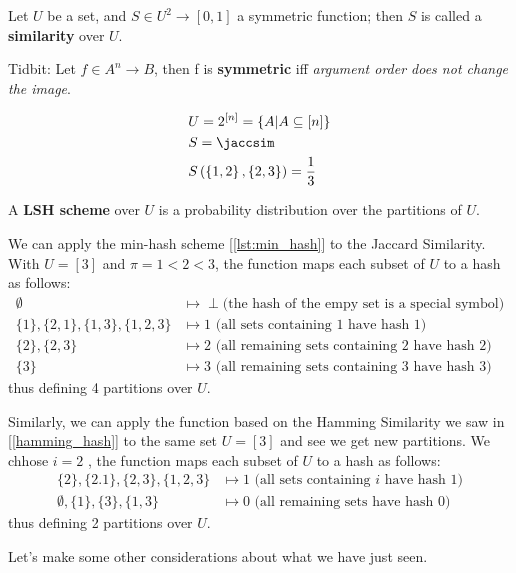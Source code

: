 	Let $U$ be a set, and $S \in U^2 \to [0, 1]$ a symmetric function; then $S$ is called a \textbf{similarity} over $U$.
	
	Tidbit: Let $f \in A^n \to B$, then f is \textbf{symmetric} iff \textit{argument order does not change the image}. %
	
	\ex \begin{align*}
		& U=2^{[n]}=\left\lbrace A | A \subseteq [n] \right\rbrace \\
		& S=\jaccsim \\
		& S\left( \left\lbrace 1,2 \right\rbrace , \left\lbrace 2,3 \right\rbrace \right) =\frac{1}{3}
	\end{align*}
	
	A \textbf{LSH scheme} over $U$ is a probability distribution over the partitions of $U$.
	
	\ex We can apply the min-hash scheme [\ref{lst:min_hash}] to the Jaccard Similarity. With $U=[3]$ and $\pi = 1<2<3$, the function maps each subset of $U$ to a hash as follows:
	\begin{align*}
		\emptyset &\mapsto \perp \text{(the hash of the empy set is a special symbol)} \\
		\{1\}, \{2,1\}, \{1,3\}, \{1,2,3\} &\mapsto 1 \text{ (all sets containing 1 have hash 1)} \\
		\{2\}, \{2,3\} &\mapsto 2 \text{ (all remaining sets containing 2 have hash 2)} \\
		\{3\} &\mapsto 3 \text{ (all remaining sets containing 3 have hash 3)}
	\end{align*}
	thus defining 4 partitions over $U$.
	
	\ex Similarly, we can apply the function based on the Hamming Similarity we saw in [\ref{hamming_hash}] to the same set $U=[3]$ and see we get new partitions. We chhose $i = 2$ \uar, the function maps each subset of $U$ to a hash as follows:
	\begin{align*}
	\{2\}, \{2.1\}, \{2,3\}, \{1,2,3\} &\mapsto 1 \text{ (all sets containing $i$ have hash 1)} \\
	\emptyset, \{1\}, \{3\}, \{1,3\} &\mapsto 0 \text{ (all remaining sets have hash 0)}
	\end{align*}
	thus defining 2 partitions over $U$.
	
	Let's make some other considerations about what we have just seen.
	
	
